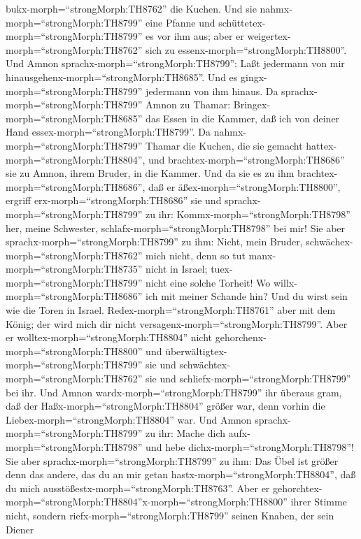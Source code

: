 bukx-morph=``strongMorph:TH8762'' die Kuchen.  Und sie
nahmx-morph=``strongMorph:TH8799'' eine Pfanne und
schüttetex-morph=``strongMorph:TH8799'' es vor ihm aus; aber er
weigertex-morph=``strongMorph:TH8762'' sich zu
essenx-morph=``strongMorph:TH8800''. Und Amnon
sprachx-morph=``strongMorph:TH8799'': Laßt jedermann von mir
hinausgehenx-morph=``strongMorph:TH8685''. Und es
gingx-morph=``strongMorph:TH8799'' jedermann von ihm hinaus.
 Da sprachx-morph=``strongMorph:TH8799'' Amnon zu Thamar:
Bringex-morph=``strongMorph:TH8685'' das Essen in die Kammer, daß ich
von deiner Hand essex-morph=``strongMorph:TH8799''. Da
nahmx-morph=``strongMorph:TH8799'' Thamar die Kuchen, die sie gemacht
hattex-morph=``strongMorph:TH8804'', und
brachtex-morph=``strongMorph:TH8686'' sie zu Amnon, ihrem Bruder, in die
Kammer.  Und da sie es zu ihm
brachtex-morph=``strongMorph:TH8686'', daß er
äßex-morph=``strongMorph:TH8800'', ergriff
erx-morph=``strongMorph:TH8686'' sie und
sprachx-morph=``strongMorph:TH8799'' zu ihr:
Kommx-morph=``strongMorph:TH8798'' her, meine Schwester,
schlafx-morph=``strongMorph:TH8798'' bei mir!  Sie aber
sprachx-morph=``strongMorph:TH8799'' zu ihm: Nicht, mein Bruder,
schwächex-morph=``strongMorph:TH8762'' mich nicht, denn so tut
manx-morph=``strongMorph:TH8735'' nicht in Israel;
tuex-morph=``strongMorph:TH8799'' nicht eine solche Torheit!
 Wo willx-morph=``strongMorph:TH8686'' ich mit meiner
Schande hin? Und du wirst sein wie die Toren in Israel.
Redex-morph=``strongMorph:TH8761'' aber mit dem König; der wird mich dir
nicht versagenx-morph=``strongMorph:TH8799''.  Aber er
wolltex-morph=``strongMorph:TH8804'' nicht
gehorchenx-morph=``strongMorph:TH8800'' und
überwältigtex-morph=``strongMorph:TH8799'' sie und
schwächtex-morph=``strongMorph:TH8762'' sie und
schliefx-morph=``strongMorph:TH8799'' bei ihr.  Und Amnon
wardx-morph=``strongMorph:TH8799'' ihr überaus gram, daß der
Haßx-morph=``strongMorph:TH8804'' größer war, denn vorhin die
Liebex-morph=``strongMorph:TH8804'' war. Und Amnon
sprachx-morph=``strongMorph:TH8799'' zu ihr: Mache dich
aufx-morph=``strongMorph:TH8798'' und hebe
dichx-morph=``strongMorph:TH8798''!  Sie aber
sprachx-morph=``strongMorph:TH8799'' zu ihm: Das Übel ist größer denn
das andere, das du an mir getan hastx-morph=``strongMorph:TH8804'', daß
du mich ausstößestx-morph=``strongMorph:TH8763''. Aber er
gehorchtex-morph=``strongMorph:TH8804''x-morph=``strongMorph:TH8800''
ihrer Stimme nicht,  sondern
riefx-morph=``strongMorph:TH8799'' seinen Knaben, der sein Diener
